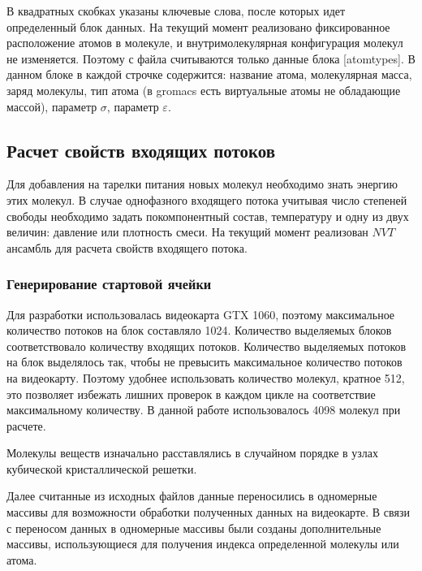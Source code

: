 В квадратных скобках указаны ключевые слова, после которых идет определенный блок данных. На текущий момент реализовано фиксированное расположение атомов в молекуле, и внутримолекулярная конфигурация молекул не изменяется. Поэтому с файла считываются только данные блока  [atomtypes]. В данном блоке в каждой строчке содержится: название атома, молекулярная масса, заряд молекулы, тип атома (в gromacs есть виртуальные атомы не обладающие массой), параметр $\sigma$, параметр $\varepsilon$. 

\subsection{Расчет свойств входящих потоков}
Для добавления на тарелки питания новых молекул необходимо знать энергию этих молекул. В случае однофазного входящего потока учитывая число степеней свободы необходимо задать покомпонентный состав, температуру и одну из двух величин: давление или плотность смеси. На текущий момент реализован $NVT$ ансамбль для расчета свойств входящего потока.



\subsubsection{Генерирование стартовой ячейки}
Для разработки использовалась видеокарта GTX 1060, поэтому максимальное количество потоков на блок составляло 1024. Количество выделяемых блоков соответствовало количеству входящих потоков. Количество выделяемых потоков на блок выделялось так, чтобы не превысить максимальное количество потоков на видеокарту. Поэтому удобнее использовать количество молекул, кратное 512, это позволяет избежать лишних проверок в каждом цикле на соответствие максимальному количеству. В данной работе использовалось 4098 молекул при расчете. 

Молекулы веществ изначально расставлялись  в случайном порядке в узлах кубической кристаллической решетки. 

Далее считанные из исходных файлов данные переносились в одномерные массивы для возможности обработки полученных данных на видеокарте. В связи с переносом данных в одномерные массивы были созданы дополнительные массивы, использующиеся для получения индекса определенной молекулы или атома.  

